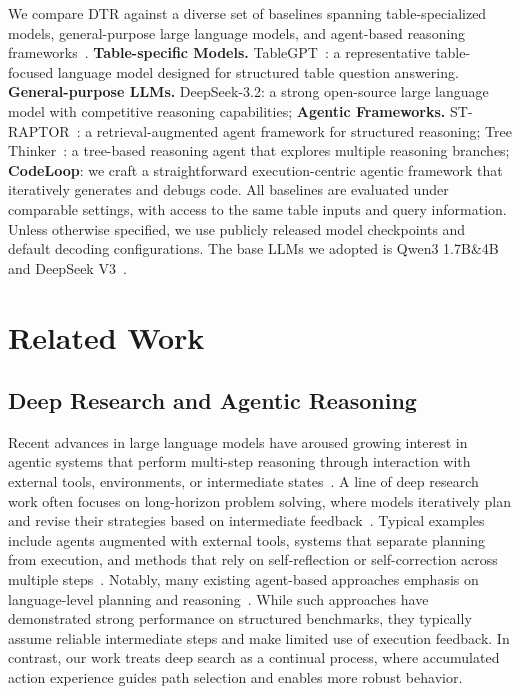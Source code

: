We compare DTR against a diverse set of baselines spanning table-specialized models, general-purpose large language models, and agent-based reasoning frameworks~\cite{zheng2024multimodal, lu2025youtu}. 
\textbf{Table-specific Models.} TableGPT~\cite{gong2020tablegpt}: a representative table-focused language model designed for structured table question answering. \textbf{General-purpose LLMs.} DeepSeek-3.2: a strong open-source large language model with competitive reasoning capabilities; \textbf{Agentic Frameworks.} ST-RAPTOR~\cite{tang2025st}: a retrieval-augmented agent framework for structured reasoning; Tree Thinker~\cite{wu2025realhitbench}: a tree-based reasoning agent that explores multiple reasoning branches; \textbf{CodeLoop}: we craft a straightforward execution-centric agentic framework that iteratively generates and debugs code. All baselines are evaluated under comparable settings, with access to the same table inputs and query information.
Unless otherwise specified, we use publicly released model checkpoints and default decoding configurations. The base LLMs we adopted is Qwen3 1.7B\&4B~\cite{yang2025qwen3} and DeepSeek V3~\cite{liu2024deepseek}.

\section{Related Work}
\subsection{Deep Research and Agentic Reasoning}
Recent advances in large language models have aroused growing interest in agentic systems that perform multi-step reasoning through interaction with external tools, environments, or intermediate states~\cite{zhao2024expel,huang2024understanding,gong2020tablegpt}. A line of deep research work often focuses on long-horizon problem solving, where models iteratively plan and revise their strategies based on intermediate feedback~\cite{wolflein2025llm}. Typical examples include agents augmented with external tools, systems that separate planning from execution, and methods that rely on self-reflection or self-correction across multiple steps~\cite{renze2024self,dagan2023dynamic}. Notably, many existing agent-based approaches emphasis on language-level planning and reasoning~\cite{ge2025samule,song2023llm}. While such approaches have demonstrated strong performance on structured benchmarks, they typically assume reliable intermediate steps and make limited use of execution feedback. In contrast, our work treats deep search as a continual process, where accumulated action experience guides path selection and enables more robust behavior.

